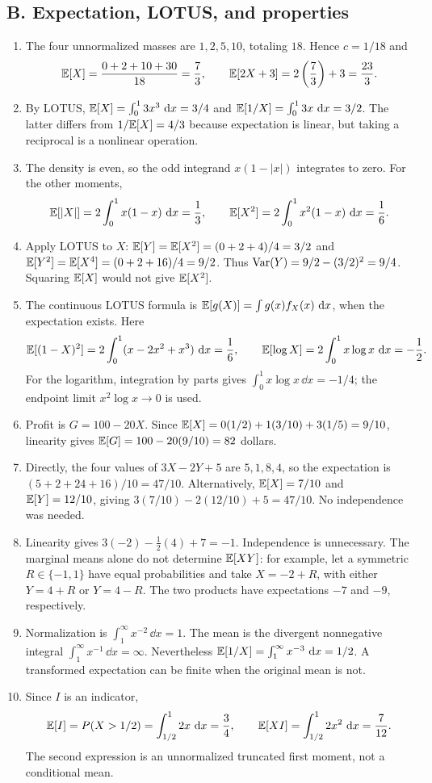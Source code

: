 \subsection{B. Expectation, LOTUS, and properties}
\begin{enumerate}[label=\textbf{B\arabic*.},leftmargin=*,itemsep=1em]
\item The four unnormalized masses are $1,2,5,10$, totaling $18$. Hence $c=1/18$ and
\[
\mathbb E[X]=\frac{0+2+10+30}{18}=\frac73,\qquad
\mathbb E[2X+3]=2\left(\frac73\right)+3=\frac{23}{3}.
\]
\item By LOTUS, $\mathbb E[X]=\int_0^13x^3\,\,\mathrm d x=3/4$ and $\mathbb E[1/X]=\int_0^13x\,\,\mathrm d x=3/2$. The latter differs from $1/\mathbb E[X]=4/3$ because expectation is linear, but taking a reciprocal is a nonlinear operation.
\item The density is even, so the odd integrand $x(1-|x|)$ integrates to zero. For the other moments,
\[
\mathbb E[|X|]=2\int_0^1x(1-x)\,\,\mathrm d x=\frac13,\qquad
\mathbb E[X^2]=2\int_0^1x^2(1-x)\,\,\mathrm d x=\frac16.
\]
\item Apply LOTUS to $X$: $\mathbb E[Y]=\mathbb E[X^2]=(0+2+4)/4=3/2$ and $\mathbb E[Y^2]=\mathbb E[X^4]=(0+2+16)/4=9/2$. Thus $\operatorname{Var}(Y)=9/2-(3/2)^2=9/4$. Squaring $\mathbb E[X]$ would not give $\mathbb E[X^2]$.
\item The continuous LOTUS formula is $\mathbb E[g(X)]=\int g(x)f_X(x)\,\,\mathrm d x$, when the expectation exists. Here
\[
\mathbb E[(1-X)^2]=2\int_0^1(x-2x^2+x^3)\,\,\mathrm d x=\frac16,
\qquad \mathbb E[\log X]=2\int_0^1x\log x\,\,\mathrm d x=-\frac12.
\]
For the logarithm, integration by parts gives $\int_0^1x\log x\,\dd x=-1/4$; the endpoint limit $x^2\log x\to0$ is used.
\item Profit is $G=100-20X$. Since $\mathbb E[X]=0(1/2)+1(3/10)+3(1/5)=9/10$, linearity gives $\mathbb E[G]=100-20(9/10)=82$ dollars.
\item Directly, the four values of $3X-2Y+5$ are $5,1,8,4$, so the expectation is $(5+2+24+16)/10=47/10$. Alternatively, $\mathbb E[X]=7/10$ and $\mathbb E[Y]=12/10$, giving $3(7/10)-2(12/10)+5=47/10$. No independence was needed.
\item Linearity gives $3(-2)-\tfrac12(4)+7=-1$. Independence is unnecessary. The marginal means alone do not determine $\mathbb E[XY]$: for example, let a symmetric $R\in\{-1,1\}$ have equal probabilities and take $X=-2+R$, with either $Y=4+R$ or $Y=4-R$. The two products have expectations $-7$ and $-9$, respectively.
\item Normalization is $\int_1^\infty x^{-2}\,\dd x=1$. The mean is the divergent nonnegative integral $\int_1^\infty x^{-1}\,\dd x=\infty$. Nevertheless $\mathbb E[1/X]=\int_1^\infty x^{-3}\,\,\mathrm d x=1/2$. A transformed expectation can be finite when the original mean is not.
\item Since $I$ is an indicator,
\[
\mathbb E[I]=P(X>1/2)=\int_{1/2}^12x\,\,\mathrm d x=\frac34,\qquad
\mathbb E[XI]=\int_{1/2}^12x^2\,\,\mathrm d x=\frac7{12}.
\]
The second expression is an unnormalized truncated first moment, not a conditional mean.
\end{enumerate}

